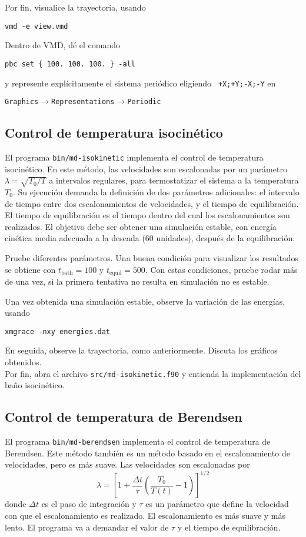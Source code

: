 \documentclass[10pt,a4paper,ssfamily]{exam}
\newcommand{\1}{{\bf 1}}
\newcommand{\2}{{\bf 2}}
\newcommand{\3}{{\bf 3}}
\newcommand{\command}[1]{\begin{center}{\tt #1}\end{center}}
\begin{document}
Por fin, visualice la trayectoria, usando
\command{vmd -e view.vmd}
Dentro de VMD, dé el comando 
\command{pbc set \{ 100. 100. 100. \} -all}
y represente explícitamente el sistema periódico eligiendo {\tt
+X;+Y;-X;-Y} en
\command{Graphics$\to$Representations$\to$Periodic}


\subsection{Control de temperatura isocinético}

El programa {\tt bin/md-isokinetic} implementa el control de temperatura
isocinético. En este método, las velocidades son escalonadas por un
parámetro $\lambda = \sqrt{T_0/T}$ a intervalos regulares, para
termostatizar el sistema a la temperatura $T_0$. 
Su ejecución demanda la definición de dos parámetros
adicionales: el intervalo de tiempo entre dos escalonamientos de
velocidades, y el tiempo de equilibración. El tiempo de equilibración es
el tiempo dentro del cual los escalonamientos son realizados. El
objetivo debe ser obtener una simulación estable, con energía cinética
media adecuada a la deseada (60 unidades), después de la equilibración.

Pruebe diferentes parámetros. Una buena condición para visualizar los
resultados se obtiene con $t_{\mathrm{bath}}=100$ y
$t_{\mathrm{equil}}=500$. Con estas condiciones, pruebe rodar más de una
vez, si la primera tentativa no resulta en simulación no es estable.

Una vez obtenida una simulación estable, observe la variación de las
energías, usando 
\command{xmgrace -nxy energies.dat}
En seguida, observe la trayectoria, como anteriormente. Discuta los
gráficos obtenidos. \\

\noindent
Por fin, abra el archivo {\tt src/md-isokinetic.f90} y entienda la implementación
del baño isocinético.

\subsection{Control de temperatura de Berendsen}

El programa {\tt bin/md-berendsen} implementa el control de temperatura
de Berendsen. Este método también es un método basado en el
escalonamiento de velocidades, pero es más suave. Las velocidades son
escalonadas por
\[
\lambda = \left[  
1 + \frac{\Delta t}{\tau} \left(
\frac{T_0}{T(t)} -1
\right)
\right]^{1/2}
\]
donde $\Delta t$ es el paso de integración y $\tau$ es un parámetro que
define la velocidad con que el escalonamiento es realizado. El
escalonamiento es más suave y más lento. El programa va a demandar el
valor de $\tau$ y el tiempo de equilibración. 
\end{document}
